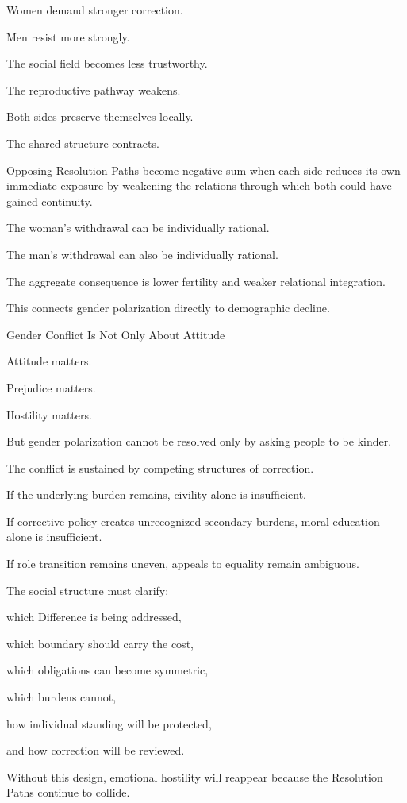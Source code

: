 Women demand stronger correction.

Men resist more strongly.

The social field becomes less trustworthy.

The reproductive pathway weakens.

Both sides preserve themselves locally.

The shared structure contracts.

Opposing Resolution Paths become negative-sum when each side reduces its own immediate exposure by weakening the relations through which both could have gained continuity.

The woman’s withdrawal can be individually rational.

The man’s withdrawal can also be individually rational.

The aggregate consequence is lower fertility and weaker relational integration.

This connects gender polarization directly to demographic decline.

Gender Conflict Is Not Only About Attitude

Attitude matters.

Prejudice matters.

Hostility matters.

But gender polarization cannot be resolved only by asking people to be kinder.

The conflict is sustained by competing structures of correction.

If the underlying burden remains, civility alone is insufficient.

If corrective policy creates unrecognized secondary burdens, moral education alone is insufficient.

If role transition remains uneven, appeals to equality remain ambiguous.

The social structure must clarify:

which Difference is being addressed,

which boundary should carry the cost,

which obligations can become symmetric,

which burdens cannot,

how individual standing will be protected,

and how correction will be reviewed.

Without this design, emotional hostility will reappear because the Resolution Paths continue to collide.

